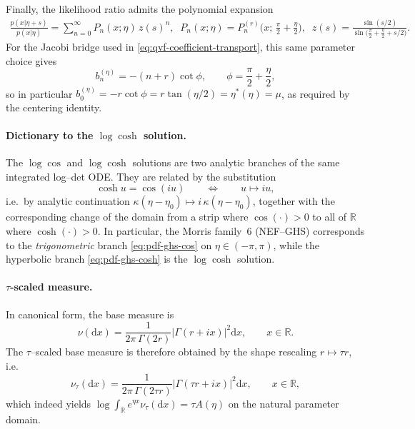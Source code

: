 \documentclass[a4paper,11pt]{article}
\numberwithin{equation}{section}
\theoremstyle{plain}
\theoremstyle{definition}
\theoremstyle{remark}
\newcommand{\R}{\ensuremath{\mathbb{R}}\xspace}
\newcommand{\1}{\ensuremath{\mathds{1}}\xspace}
\newcommand{\dd}{\ensuremath{{\textrm{d}}}\xspace}
\begin{document}
Finally, the likelihood ratio admits the polynomial expansion
\begin{align}
\frac{p(x| \eta+s)}{p(x| \eta)}
=\sum_{n=0}^\infty P_n(x;\eta)\,z(s)^n,
\;\;
P_n(x;\eta)=P_n^{(r)}\!\Big(x;\,\frac{\pi}{2}+\frac{\eta}{2}\Big),
\;\;
z(s)=\frac{\sin(s/2)}{\sin\big(\frac{\pi}{2}+\frac{\eta}{2}+s/2\big)}.
\end{align}
For the Jacobi bridge used in \eqref{eq:qvf-coefficient-transport}, this same parameter choice gives
\[
b_n^{(\eta)}=-(n+r)\cot\phi,
\qquad
\phi=\frac{\pi}{2}+\frac{\eta}{2},
\]
so in particular $b_0^{(\eta)}=-r\cot\phi=r\tan(\eta/2)=\eta^\ast(\eta)=\mu$, as required by the centering identity.

\paragraph{Dictionary to the \texorpdfstring{$\log\cosh$}{logcosh} solution.}
The $\log\cos$ and $\log\cosh$ solutions are two analytic branches of the same integrated log--det ODE.
They are related by the substitution
\[
\cosh u=\cos(iu)\qquad\Longleftrightarrow\qquad u\mapsto iu,
\]
i.e.\ by analytic continuation $\kappa(\eta-\eta_0)\mapsto i\,\kappa(\eta-\eta_0)$, together with the
corresponding change of the domain from a strip where $\cos(\cdot)>0$ to all of $\R$ where $\cosh(\cdot)>0$.
In particular, the Morris family~6 (NEF--GHS) corresponds to the \emph{trigonometric} branch \eqref{eq:pdf-ghs-cos}
on $\eta\in(-\pi,\pi)$, while the hyperbolic branch \eqref{eq:pdf-ghs-cosh} is the $\log\cosh$ solution.

\paragraph{$\tau$-scaled measure.}
In canonical form, the base measure is
\[
\nu(\dd x)=\frac{1}{2\pi\,\Gamma(2r)}\left|\Gamma(r+i x)\right|^2\dd x,
\qquad x\in\R.
\]
The $\tau$--scaled base measure is therefore obtained by the shape rescaling $r\mapsto \tau r$, i.e.
\[
\nu_\tau(\dd x)=\frac{1}{2\pi\,\Gamma(2\tau r)}\left|\Gamma(\tau r+i x)\right|^2\dd x,
\qquad x\in\R,
\]
which indeed yields $\log\int_{\R} e^{\eta x}\nu_\tau(\dd x)=\tau A(\eta)$ on the natural parameter domain.
\end{document}

